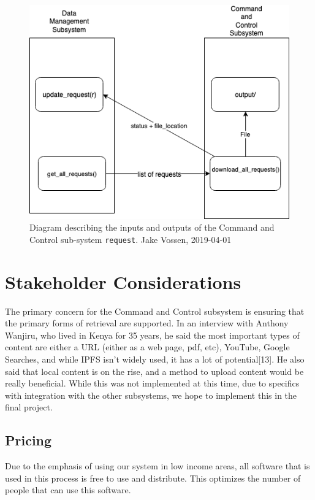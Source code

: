 \documentclass{article}
\begin{document}
\begin{figure}[h]
  \centering
  \includegraphics[scale=.5]{input-output.png}
  \caption{\begingroup \fontsize{10pt}{12pt}\selectfont Diagram
    describing the inputs and outputs of the Command and Control sub-system
    \texttt{request}. Jake Vossen, 2019-04-01 \endgroup}
\end{figure}

\section{Stakeholder Considerations}

The primary concern for the Command and Control subsystem is ensuring
that the primary forms of retrieval are supported. In an interview with
Anthony Wanjiru, who lived in Kenya for 35 years, he said the most
important types of content are either a URL (either as a web page,
pdf, etc), YouTube, Google Searches, and while IPFS isn't widely used,
it has a lot of potential[13]. He also said that local content is on
the rise, and a method to upload content would be really
beneficial. While this was not implemented at this time, due to
specifics with integration with the other subsystems, we hope to
implement this in the final project.

\subsection{Pricing}

Due to the emphasis of using our system in low income areas, all
software that is used in this process is free to use and
distribute. This optimizes the number of people that can use this
software. 
\end{document}
